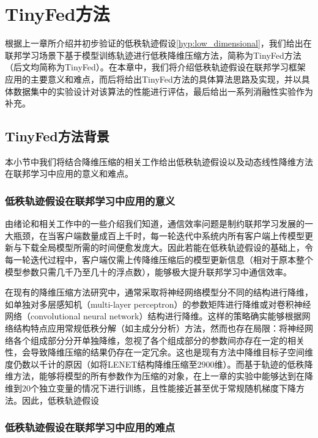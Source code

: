 \chapter{TinyFed方法}

根据上一章所介绍并初步验证的低秩轨迹假设\ref{hyp:low_dimensional}，我们给出在联邦学习场景下基于模型训练轨迹进行低秩降维压缩方法，简称为TinyFed方法（后文均简称为TinyFed）。在本章中，我们将介绍低秩轨迹假设在联邦学习框架应用的主要意义和难点，而后将给出TinyFed方法的具体算法思路及实现，并以具体数据集中的实验设计对该算法的性能进行评估，最后给出一系列消融性实验作为补充。

\section{TinyFed方法背景}

本小节中我们将结合降维压缩的相关工作给出低秩轨迹假设以及动态线性降维方法在联邦学习中应用的意义和难点。

\subsection{低秩轨迹假设在联邦学习中应用的意义}

由绪论和相关工作中的一些介绍我们知道，通信效率问题是制约联邦学习发展的一大瓶颈，在当客户端数量成百上千时，每一轮迭代中系统内所有客户端上传模型更新与下载全局模型所需的时间便愈发庞大。因此若能在低秩轨迹假设的基础上，令每一轮迭代过程中，客户端仅需上传降维压缩后的模型更新信息（相对于原本整个模型参数只需几千乃至几十的浮点数），能够极大提升联邦学习中通信效率。

在现有的降维压缩方法研究中，通常采取将神经网络模型分不同的结构进行降维，如单独对多层感知机（multi-layer perceptron）的参数矩阵进行降维或对卷积神经网络（convolutional neural network）结构进行降维。这样的策略确实能够根据网络结构特点应用常规低秩分解（如主成分分析）方法，然而也存在局限：将神经网络各个组成部分分开单独降维，忽视了各个组成部分的参数间亦存在一定的相关性，会导致降维压缩的结果仍存在一定冗余。这也是现有方法中降维目标子空间维度仍数以千计的原因（如\parencite{li2018measuring}将LENET结构降维压缩至$2900$维）。而基于轨迹的低秩降维方法，能够将模型的所有参数作为压缩的对象，在上一章的实验中能够达到在降维到$20$个独立变量的情况下进行训练，且性能接近甚至优于常规随机梯度下降方法。因此，低秩轨迹假设

\subsection{低秩轨迹假设在联邦学习中应用的难点}

